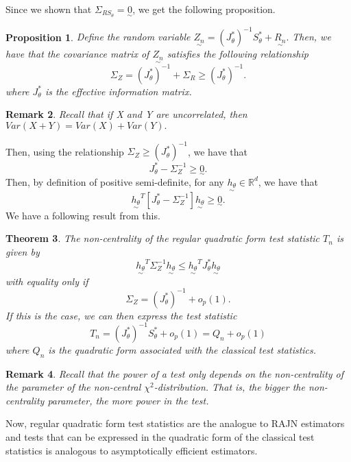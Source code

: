 \documentclass[twoside]{article}
\newcounter{lecnum}
\newtheorem{theorem}{Theorem}[lecnum]
\newtheorem{proposition}[theorem]{Proposition}
\newtheorem{remark}[theorem]{Remark}
\newcommand{\utilde}{\underset{\sim}}
\begin{document}
Since we shown that $\Sigma_{R S_{\theta}} = \utilde{0}$, we get the following proposition.

\begin{proposition}Define the random variable $
\utilde{Z_n} = (J_{\theta}^{*})^{-1}S_{\theta}^{*} + \utilde{R_n}.
$ Then, we have that the covariance matrix of $\utilde{Z_n}$ satisfies the following relationship
$$
\Sigma_{Z} = (J_{\theta}^{*})^{-1} + \Sigma_R \geq (J_{\theta}^{*})^{-1}.
$$
where $J_{\theta}^{*}$ is the effective information matrix.
\end{proposition}
\begin{remark}Recall that if X and Y are uncorrelated, then $Var(X+Y) = Var(X) + Var(Y).$
\end{remark}

Then, using the relationship $\Sigma_{Z} \geq (J_{\theta}^{*})^{-1}$, we have that 
$$
J_{\theta}^{*} - \Sigma_{Z}^{-1} \geq \utilde{0}.
$$
Then, by definition of positive semi-definite, for any $\utilde{h_{\theta}} \in \mathbb{R}^d$, we have that 
$$
\utilde{h_{\theta}}^T[J_{\theta}^{*} - \Sigma_{Z}^{-1}]\utilde{h_{\theta}} \geq \utilde{0}.
$$
We have a following result from this.
\begin{theorem}The non-centrality of the regular quadratic form test statistic $T_n$ is given by 
$$
 \utilde{h_{\theta}}^T\Sigma_{Z}^{-1}\utilde{h_{\theta}} \leq  \utilde{h_{\theta}}^TJ_{\theta}^{*}\utilde{h_{\theta}}
$$
with equality only if 
$$
\Sigma_{Z} = (J_{\theta}^{*})^{-1} + o_p(1).
$$
If this is the case, we can then express the test statistic 
$$
T_n = (J_{\theta}^{*})^{-1}S_{\theta}^* + o_p(1) = Q_n + o_p(1)
$$
where $Q_n$ is the quadratic form associated with the classical test statistics.
\end{theorem}

\begin{remark}Recall that the power of a test only depends on the non-centrality of the parameter of the non-central $\chi^2$-distribution. That is, the bigger the non-centrality parameter, the more power in the test.
\end{remark}

Now, regular quadratic form test statistics are the analogue to RAJN estimators and tests that can be expressed in the quadratic form of the classical test statistics is analogous to asymptotically efficient estimators.
\end{document}
